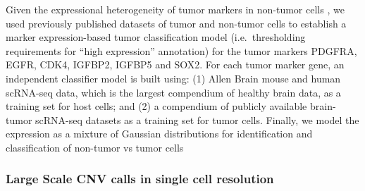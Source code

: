 \documentclass[]{article}
\newcommand{\hlnum}[1]{\textcolor[rgb]{0.816,0.125,0.439}{#1}}%
\newcommand{\hlstr}[1]{\textcolor[rgb]{0.251,0.627,0.251}{#1}}%
\newcommand{\hlstd}[1]{\textcolor[rgb]{0.251,0.251,0.251}{#1}}%
\newenvironment{Shaded}{\begin{myshaded}}{\end{myshaded}}
\newcommand{\DecValTok}[1]{\hlnum{#1}}
\newcommand{\SpecialCharTok}[1]{\hlstr{#1}}
\newcommand{\StringTok}[1]{\hlstr{#1}}
\newcommand{\OtherTok}[1]{{#1}}
\newcommand{\FunctionTok}[1]{\hlstd{#1}}
\newcommand{\AttributeTok}[1]{{#1}}
\newcommand{\NormalTok}[1]{\hlstd{#1}}
\begin{document}
Given the expressional heterogeneity of tumor markers in non-tumor cells , we used previously published datasets of tumor and non-tumor cells to establish a marker expression-based tumor classification model (i.e.~thresholding requirements for ``high expression'' annotation) for the tumor markers PDGFRA, EGFR, CDK4, IGFBP2, IGFBP5 and SOX2. For each tumor marker gene, an independent classifier model is built using: (1) Allen Brain mouse and human scRNA-seq data, which is the largest compendium of healthy brain data, as a training set for host cells; and (2) a compendium of publicly available brain-tumor scRNA-seq datasets as a training set for tumor cells. Finally, we model the expression as a mixture of Gaussian distributions for identification and classification of non-tumor vs tumor cells

\begin{Shaded}
\end{Shaded}

\hypertarget{large-scale-cnv-calls-in-single-cell-resolution}{%
\subsubsection{Large Scale CNV calls in single cell resolution}\label{large-scale-cnv-calls-in-single-cell-resolution}}
\end{document}
